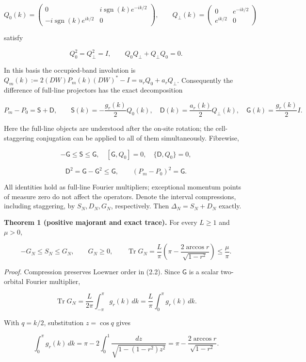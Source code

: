 \documentclass[
  10pt,
  a4paper,
]{article}
\begin{document}
\[
 Q_0(k)=\begin{pmatrix}
 0&i\operatorname{sgn}(k)e^{-ik/2}\\
 -i\operatorname{sgn}(k)e^{ik/2}&0
 \end{pmatrix},\qquad
 Q_\perp(k)=\begin{pmatrix}
 0&e^{-ik/2}\\e^{ik/2}&0
 \end{pmatrix}
\]

satisfy

\[
 Q_0^2=Q_\perp^2=I,\qquad Q_0Q_\perp+Q_\perp Q_0=0.
\]

In this basis the occupied-band involution is \(Q_m(k):=2(DW)P_m(k)(DW)^*-I=u_rQ_0+a_rQ_\perp\). Consequently the difference of full-line projectors has the exact decomposition

\[
 P_m-P_0=\mathsf S+\mathsf D,\qquad
 \mathsf S(k)=-\frac{g_r(k)}2 Q_0(k),\quad
 \mathsf D(k)=\frac{a_r(k)}2Q_\perp(k),\quad
 \mathsf G(k)=\frac{g_r(k)}2I.
 \tag{2.1}
\]

Here the full-line objects are understood after the on-site rotation; the cell-staggering conjugation can be applied to all of them simultaneously. Fibrewise,

\[
 -\mathsf G\le\mathsf S\le\mathsf G,\quad
 [\mathsf G,Q_0]=0,\quad
 \{\mathsf D,Q_0\}=0,
 \tag{2.2}
\]

\[
 \mathsf D^2=\mathsf G-\mathsf G^2\le\mathsf G,
 \qquad
 \boxed{(P_m-P_0)^2=\mathsf G}.
 \tag{2.3}
\]

All identities hold as full-line Fourier multipliers; exceptional momentum points of measure zero do not affect the operators. Denote the interval compressions, including staggering, by \(S_N,D_N,G_N\), respectively. Then \(\Delta_N=S_N+D_N\) exactly.

\textbf{Theorem 1 (positive majorant and exact trace).} For every \(L\ge1\) and \(\mu>0\),

\[
 \boxed{-G_N\le S_N\le G_N,\qquad G_N\ge0,\qquad
 \operatorname{Tr}G_N=\frac L\pi\left(\pi-
 \frac{2\arccos r}{\sqrt{1-r^2}}\right)\le\frac\mu\pi.}
 \tag{2.4}
\]

\emph{Proof.} Compression preserves Loewner order in (2.2). Since \(\mathsf G\) is a scalar two-orbital Fourier multiplier,

\[
 \operatorname{Tr}G_N=\frac L{2\pi}\int_{-\pi}^{\pi}g_r(k)\,dk
 =\frac L\pi\int_0^\pi g_r(k)\,dk.
\]

With \(q=k/2\), substitution \(z=\cos q\) gives

\[
 \int_0^\pi g_r(k)\,dk
 =\pi-2\int_0^1\frac{dz}{\sqrt{1-(1-r^2)z^2}}
 =\pi-\frac{2\arccos r}{\sqrt{1-r^2}}.
\]
\end{document}
